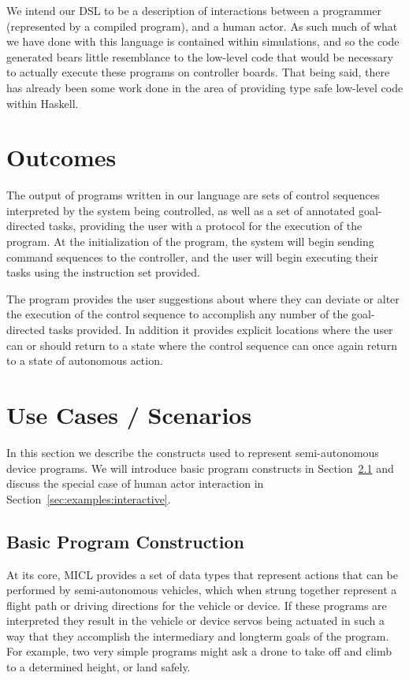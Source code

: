 \documentclass[11pt]{article}
\begin{document}
We intend our DSL to be a description of interactions between a programmer
(represented by a compiled program), and a human actor. As such much of what
we have done with this language is contained within simulations, and so the
code generated bears little resemblance to the low-level code that would be
necessary to actually execute these programs on controller boards. That being
said, there has already been some work done in the area of providing type safe
low-level code within Haskell. \cite{elliot2015ivory}


\section{Outcomes}
\label{sec:outcomes}
The output of programs written in our language are sets of control sequences
interpreted by the system being controlled, as well as a set of annotated
goal-directed tasks, providing the user with a protocol for the execution of
the program. At the initialization of the program, the system will begin
sending command sequences to the controller, and the user will begin executing
their tasks using the instruction set provided.

The program provides the user suggestions about where they can deviate or
alter the execution of the control sequence to accomplish any number of the
goal-directed tasks provided. In addition it provides explicit locations where
the user can or should return to a state where the control sequence can once
again return to a state of autonomous action.


\section{Use Cases / Scenarios}
\label{sec:examples}
In this section we describe the constructs used to represent semi-autonomous
device programs. We will introduce basic program constructs in
Section~\ref{sec:examples:basic} and discuss the special case of human actor
interaction in Section~\ref{sec:examples:interactive}.

\subsection{Basic Program Construction}
\label{sec:examples:basic}
At its core, MICL provides a set of data types that represent actions that can
be performed by semi-autonomous vehicles, which when strung together represent
a flight path or driving directions for the vehicle or device. If these
programs are interpreted they result in the vehicle or device servos being
actuated in such a way that they accomplish the intermediary and longterm
goals of the program. For example, two very simple programs might ask a drone
to take off and climb to a determined height, or land safely.
\end{document}

